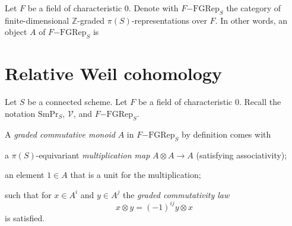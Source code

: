 \documentclass[a4paper,10pt]{article}
\def\basepieces{\mathscr{V}}
\def\smpr{\mathrm{SmPr}}
\newcommand{\fgrep}[2]{#1\mathrm{-FGRep}_{#2}}
\def\tensor{\otimes}
\begin{document}
Let $F$ be a field of characteristic $0$. Denote with $\fgrep{F}{S}$ the
category of finite-dimensional $\mathbb{Z}$-graded $\pi(S)$-representations
over $F$. In other words, an object $A$ of $\fgrep{F}{S}$ is

\section{Relative Weil cohomology}

Let $S$ be a connected scheme. Let $F$ be a field of characteristic $0$. Recall
the notation $\smpr_{S}$, $\basepieces$, and $\fgrep{F}{S}$.

A \emph{graded commutative monoid} $A$ in $\fgrep{F}{S}$ by definition comes
with
\begin{enumerate*}[label=(\alph*)] %
	\item a $\pi(S)$-equivariant \emph{multiplication map} $A \tensor A \to
		A$ (satisfying associativity);
	\item an element $1 \in A$ that is a unit for the multiplication;
\end{enumerate*} %
such that for $x \in A^{i}$ and $y \in A^{j}$ the \emph{graded commutativity
law}
\[
	x \tensor y = (-1)^{ij} y \tensor x
\]
is satisfied.
\end{document}
